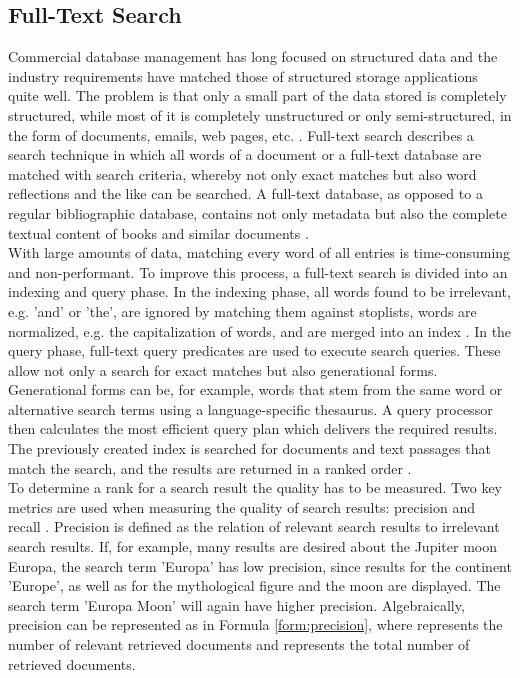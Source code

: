 \subsection{Full-Text Search}
Commercial database management has long focused on structured data and the industry requirements have matched those of structured storage applications quite well.
The problem is that only a small part of the data stored is completely structured, while most of it is completely unstructured or only semi-structured, in the form of documents, emails, web pages, etc. \parencite[cf.][p. 7]{hamilton_microsoft_2001}. Full-text search describes a search technique in which all words of a document or a full-text database are matched with search criteria, whereby not only exact matches but also word reflections and the like can be searched. A full-text database, as opposed to a regular bibliographic database, contains not only metadata but also the complete textual content of books and similar documents \parencite[cf.][pp. 2-3]{tenopir_full_1990}.\\
With large amounts of data, matching every word of all entries is time-consuming and non-performant. To improve this process, a full-text search is divided into an indexing and query phase. In the indexing phase, all words found to be irrelevant, e.g. 'and' or 'the', are ignored by matching them against stoplists, words are normalized, e.g. the capitalization of words, and are merged into an index \parencite[cf.][p. 11]{coles_pro_2009}. In the query phase, full-text query predicates are used to execute search queries. These allow not only a search for exact matches but also generational forms. Generational forms can be, for example, words that stem from the same word or alternative search terms using a language-specific thesaurus. A query processor then calculates the most efficient query plan which delivers the required results. The previously created index is searched for documents and text passages that match the search, and the results are returned in a ranked order \parencite[cf.][pp. 11-12]{coles_pro_2009}.\\
To determine a rank for a search result the quality has to be measured. Two key metrics are used when measuring the quality of search results: precision \symp and recall \symr.
Precision is defined as the relation of relevant search results to irrelevant search results. If, for example, many results are desired about the Jupiter moon Europa, the search term 'Europa' has low precision, since results for the continent 'Europe', as well as for the mythological figure and the moon are displayed. The search term 'Europa Moon' will again have higher precision. Algebraically, precision can be represented as in Formula \ref{form:precision}, where \symn represents the number of relevant retrieved documents and \symd represents the total number of retrieved documents.
